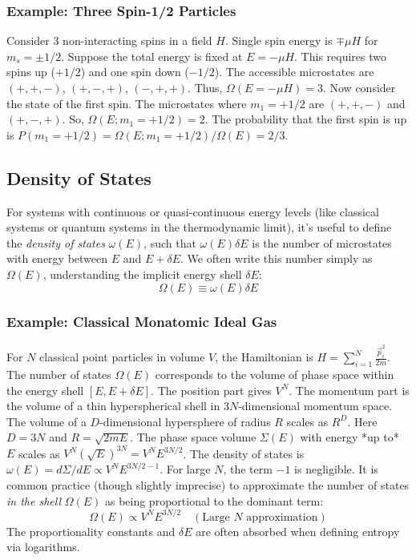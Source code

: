\documentclass[10pt, letterpaper]{article}
\begin{document}
\subsubsection*{Example: Three Spin-1/2 Particles}
Consider 3 non-interacting spins in a field $H$. Single spin energy is $\mp \mu H$ for $m_s = \pm 1/2$.
Suppose the total energy is fixed at $E = -\mu H$. This requires two spins up ($+1/2$) and one spin down ($-1/2$). The accessible microstates are $(+,+,-)$, $(+,-,+)$, $(-,+,+)$. Thus, $\Omega(E=-\mu H) = 3$.
Now consider the state of the first spin. The microstates where $m_1 = +1/2$ are $(+,+,-)$ and $(+,-,+)$. So, $\Omega(E; m_1=+1/2) = 2$.
The probability that the first spin is up is $P(m_1=+1/2) = \Omega(E; m_1=+1/2) / \Omega(E) = 2/3$.

\subsection{Density of States}
For systems with continuous or quasi-continuous energy levels (like classical systems or quantum systems in the thermodynamic limit), it's useful to define the \textit{density of states} $\omega(E)$, such that $\omega(E) \delta E$ is the number of microstates with energy between $E$ and $E+\delta E$. We often write this number simply as $\Omega(E)$, understanding the implicit energy shell $\delta E$:
\begin{equation*}
    \Omega(E) \equiv \omega(E) \delta E
\end{equation*}

\subsubsection*{Example: Classical Monatomic Ideal Gas}
For $N$ classical point particles in volume $V$, the Hamiltonian is $H = \sum_{i=1}^N \frac{\vec{p}_i^2}{2m}$.
The number of states $\Omega(E)$ corresponds to the volume of phase space within the energy shell $[E, E+\delta E]$. The position part gives $V^N$. The momentum part is the volume of a thin hyperspherical shell in $3N$-dimensional momentum space.
The volume of a $D$-dimensional hypersphere of radius $R$ scales as $R^D$. Here $D=3N$ and $R=\sqrt{2mE}$. The phase space volume $\Sigma(E)$ with energy *up to* $E$ scales as $V^N (\sqrt{E})^{3N} = V^N E^{3N/2}$.
The density of states is $\omega(E) = d\Sigma/dE \propto V^N E^{3N/2 - 1}$.
For large $N$, the term $-1$ is negligible. It is common practice (though slightly imprecise) to approximate the number of states \textit{in the shell} $\Omega(E)$ as being proportional to the dominant term:
\begin{equation*}
    \Omega(E) \propto V^N E^{3N/2} \quad (\text{Large } N \text{ approximation})
\end{equation*}
The proportionality constants and $\delta E$ are often absorbed when defining entropy via logarithms.
\end{document}
